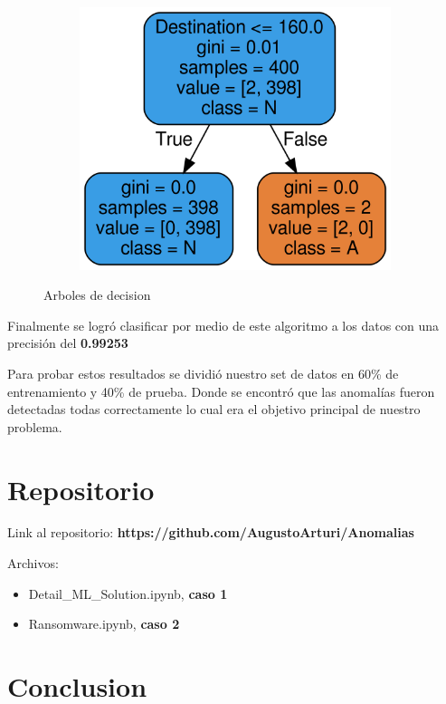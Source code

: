 \documentclass[a4paper,10pt]{article}
\begin{document}
\begin{figure}[!hbp]
\begin{subfigure}{.5\textwidth}
\end{subfigure}
\begin{subfigure}{.5\textwidth}
  \centering
  \includegraphics[width=.8\linewidth]{Wireshark/Tres/6.png}
  \caption{}
  \label{fig:sfig2}
\end{subfigure}

\caption{Arboles de decision}
\label{fig:fig}
\end{figure}

Finalmente se logró clasificar por medio de este algoritmo a los datos con una precisión del \textbf{0.99253}

\medskip

\normalsize Para probar estos resultados se dividió nuestro set de datos en 60\% de entrenamiento y 40\% de prueba. Donde se encontró que las anomalías fueron detectadas todas correctamente lo cual era el objetivo principal de nuestro problema.

\section{Repositorio}
Link al repositorio: \textbf{https://github.com/AugustoArturi/Anomalias}

Archivos:
\begin{itemize}
\item{Detail\_ML\_Solution.ipynb, \textbf{caso 1}}
\item{Ransomware.ipynb, \textbf{caso 2}}
\end{itemize}

\section{Conclusion}
\end{document}
